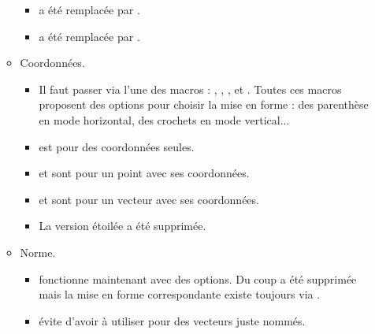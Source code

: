 \begin{itemize}[itemsep=.5em]
\begin{itemize}[itemsep=.5em]
\begin{itemize}[itemsep=.5em, label=$\rightarrow$]
            \item {}  a été remplacée par .

            \item {} a été remplacée par .
	    \end{itemize}


        \item Coordonnées.
        
        \begin{itemize}[itemsep=.5em, label=$\rightarrow$]
            \item Il faut passer via l'une des macros : , , ,  et .
                  Toutes ces macros proposent des options pour choisir la mise en forme : des parenthèse en mode horizontal, des crochets en mode vertical...

            \item {} est pour des coordonnées seules.

            \item {} et  sont pour un point avec ses coordonnées.

            \item {} et  sont pour un vecteur avec ses coordonnées.

            \item La version étoilée  a été supprimée. 
	    \end{itemize}



        \item Norme.
        
        \begin{itemize}[itemsep=.5em, label=$\rightarrow$]
            \item {} fonctionne maintenant avec des options.
                  Du coup  a été supprimée mais la mise en forme correspondante existe toujours via .

			\item {} évite d'avoir à utiliser  pour des vecteurs juste nommés.
	    \end{itemize}
    \end{itemize}





\end{itemize}
